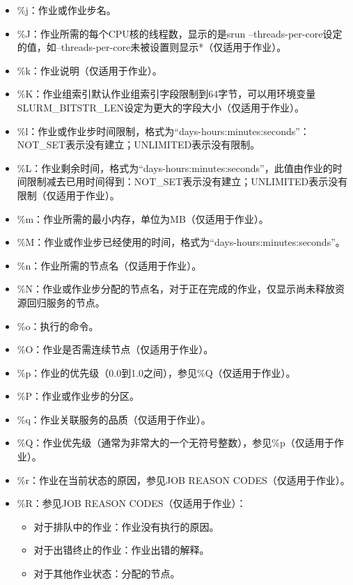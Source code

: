\begin{itemize}
\begin{itemize}
\begin{itemize}
    \item \%j：作业或作业步名。
	\item \%J：作业所需的每个CPU核的线程数，显示的是srun --threads-per-core设定的值，如--threads-per-core未被设置则显示*（仅适用于作业）。
    \item \%k：作业说明（仅适用于作业）。
    \item \%K：作业组索引默认作业组索引字段限制到64字节，可以用环境变量SLURM\_BITSTR\_LEN设定为更大的字段大小（仅适用于作业）。
    \item \%l：作业或作业步时间限制，格式为``days-hours:minutes:seconds''：NOT\_SET表示没有建立；UNLIMITED表示没有限制。
    \item \%L：作业剩余时间，格式为``days-hours:minutes:seconds''，此值由作业的时间限制减去已用时间得到：NOT\_SET表示没有建立；UNLIMITED表示没有限制（仅适用于作业）。
    \item \%m：作业所需的最小内存，单位为MB（仅适用于作业）。
    \item \%M：作业或作业步已经使用的时间，格式为``days-hours:minutes:seconds''。
    \item \%n：作业所需的节点名（仅适用于作业）。
    \item \%N：作业或作业步分配的节点名，对于正在完成的作业，仅显示尚未释放资源回归服务的节点。
    \item \%o：执行的命令。
    \item \%O：作业是否需连续节点（仅适用于作业）。
    \item \%p：作业的优先级（0.0到1.0之间），参见\%Q（仅适用于作业）。
    \item \%P：作业或作业步的分区。
    \item \%q：作业关联服务的品质（仅适用于作业）。
    \item \%Q：作业优先级（通常为非常大的一个无符号整数），参见\%p（仅适用于作业）。
    \item \%r：作业在当前状态的原因，参见JOB REASON CODES（仅适用于作业）。
    \item \%R：参见JOB REASON CODES（仅适用于作业）：
		\begin{itemize}
			\item 对于排队中的作业：作业没有执行的原因。
			\item 对于出错终止的作业：作业出错的解释。
			\item 对于其他作业状态：分配的节点。
		\end{itemize}

\end{itemize}
\end{itemize}
\end{itemize}
